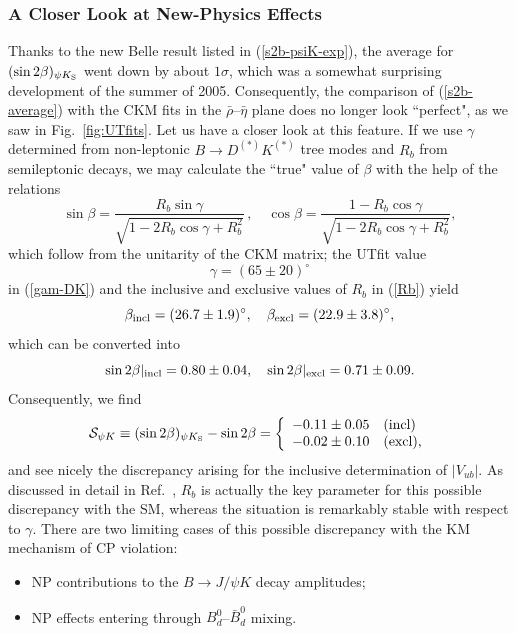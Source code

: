 \documentclass[12pt]{article}
\begin{document}
\subsubsection{A Closer Look at New-Physics Effects}
%
%
%
Thanks to the new Belle result listed in (\ref{s2b-psiK-exp}), the average for
$(\sin2\beta)_{\psi K_{\rm S}}$ went down by about $1 \sigma$, which 
was a somewhat surprising development of the summer of 2005. Consequently, 
the comparison of (\ref{s2b-average}) with the CKM fits in the
$\bar\rho$--$\bar\eta$ plane does no longer look ``perfect", as we saw 
in Fig.~\ref{fig:UTfits}. Let us have a closer look at this feature.
If we use $\gamma$ determined from non-leptonic $B\to D^{(*)} K^{(*)}$ 
tree modes and $R_b$ from semileptonic decays, we may calculate
the ``true" value of $\beta$ with the help of the relations
\begin{equation}
\sin\beta=\frac{R_b\sin\gamma}{\sqrt{1-2R_b\cos\gamma+R_b^2}}\,, \quad
\cos\beta=\frac{1-R_b\cos\gamma}{\sqrt{1-2R_b\cos\gamma+R_b^2}},
\end{equation}
which follow from the unitarity of the CKM matrix; the UTfit value 
\begin{equation}\label{gamma-tree}
\gamma=(65\pm20)^\circ
\end{equation}
in (\ref{gam-DK}) and the inclusive and exclusive values of $R_b$ in 
(\ref{Rb}) yield
\begin{equation}\label{beta-true}
\beta_{\rm incl} = (26.7\pm 1.9)^{\circ},\quad 
\beta_{\rm excl} = (22.9\pm3.8)^\circ,
\end{equation}
which can be converted into
\begin{equation}
\sin2\beta|_{\rm incl} = 0.80\pm0.04,\quad 
\sin2\beta|_{\rm excl} = 0.71\pm0.09.
\end{equation}
Consequently, we find
\begin{equation}\label{S-psi-K}
{\cal S}_{\psi K}\equiv (\sin 2\beta)_{\psi K_{\rm S}}-\sin 2\beta=
\left\{\begin{array}{ll}
-0.11\pm0.05 & \mbox{(incl)}\\
-0.02\pm0.10 & \mbox{(excl),}
\end{array}
\right.
\end{equation}
and see nicely the discrepancy arising for the inclusive determination of
$|V_{ub}|$. As discussed in detail in Ref.~\cite{BF-DMs}, $R_b$ is actually
the key parameter for this possible discrepancy with the SM, whereas 
the situation is remarkably stable with respect to $\gamma$. There are two 
limiting cases of this possible discrepancy with the KM mechanism of CP violation: 
\begin{itemize}
\item NP contributions to the $B\to J/\psi K$ decay amplitudes;
\item NP effects entering through $B^0_d$--$\bar B^0_d$ mixing. 
\end{itemize}
\end{document}
